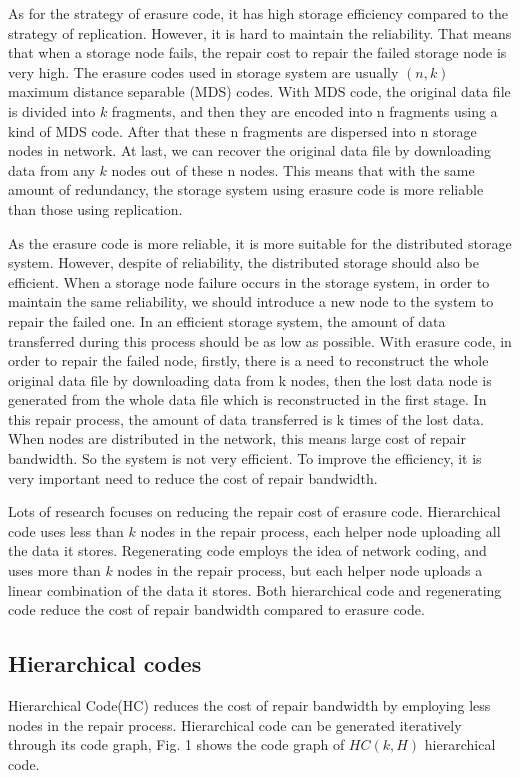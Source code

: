 \documentclass{article} %
\begin{document}
As for the strategy of erasure code, it has high storage efficiency compared to the strategy of replication. However, it is hard to maintain the reliability. That means that when a storage node fails, the repair cost to repair the failed storage node is very high. The erasure codes used in storage system are usually $(n, k)$ maximum distance separable (MDS) codes. With MDS code, the original data file is divided into $k$ fragments, and then they are encoded into n fragments using a kind of MDS code. After that these n fragments are dispersed into n storage nodes in network. At last, we can recover the original data file by downloading data from any $k$ nodes out of these n nodes. This means that with the same amount of redundancy, the storage system using erasure code is more reliable than those using replication.

As the erasure code is more reliable, it is more suitable for the distributed storage system. However, despite of reliability, the distributed storage should also be efficient. When a storage node failure occurs in the storage system, in order to maintain the same reliability, we should introduce a new node to the system to repair the failed one. In an efficient storage system, the amount of data transferred during this process should be as low as possible. With erasure code, in order to repair the failed node, firstly, there is a need to reconstruct the whole original data file by downloading data from k nodes, then the lost data node is generated from the whole data file which is reconstructed in the first stage. In this repair process, the amount of data transferred is k times of the lost data. When nodes are distributed in the network, this means large cost of repair bandwidth. So the system is not very efficient. To improve the efficiency, it is very important need to reduce the cost of repair bandwidth.

Lots of research focuses on reducing the repair cost of erasure code. Hierarchical code uses less than $k$ nodes in the repair process, each helper node uploading all the data it stores. Regenerating code employs the idea of network coding, and uses more than $k$ nodes in the repair process, but each helper node uploads a linear combination of the data it stores. Both hierarchical code and regenerating code reduce the cost of repair bandwidth compared to erasure code.

\subsection{Hierarchical codes}
Hierarchical Code(HC) reduces the cost of repair bandwidth by employing less nodes in the repair process. Hierarchical code can be generated iteratively through its code graph, Fig. 1 shows the code graph of $HC(k, H)$ hierarchical code.
\end{document}
